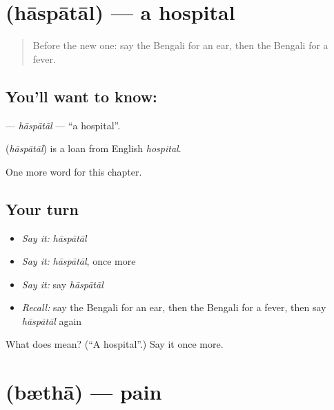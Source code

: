 \section[\texorpdfstring{\bn{হাসপাতাল} (hāspātāl)}{হাসপাতাল (hāspātāl)}]{ (hāspātāl) — a hospital}

\label{lesson:BN-C44-haspatal}



\begin{quote}
Before the new one: say the Bengali for an ear, then the Bengali for a fever.
\end{quote}

\subsection*{You'll want to know: }
\textbf{} — \emph{hāspātāl} — \textquotedblleft{}a hospital\textquotedblright{}.

\begin{cousinweb}
\textbf{} (\emph{hāspātāl}) is a loan from English \emph{hospital}.
\end{cousinweb}

\begin{grammarlens}[title={What you've built}]
One more word for this chapter.
\end{grammarlens}

\subsection*{Your turn}
\begin{itemize}
\raggedright
  \item \emph{Say it:} \emph{hāspātāl}
  \item \emph{Say it:} \emph{hāspātāl}, once more
  \item \emph{Say it:} say \emph{hāspātāl}
  \item \emph{Recall:} say the Bengali for an ear, then the Bengali for a fever, then say \emph{hāspātāl} again
\end{itemize}

\begin{tcolorbox}[breakable,colback=teal!4,colframe=teal!35!black,title={Before you move on}]
What does  mean? (\textquotedblleft{}A hospital\textquotedblright{}.) Say it once more.
\end{tcolorbox}
\section[\texorpdfstring{\bn{ব্যথা} (bæthā)}{ব্যথা (bæthā)}]{ (bæthā) — pain}

